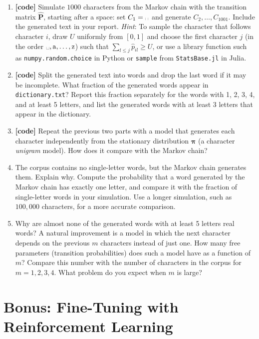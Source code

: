\documentclass[letterpaper]{article}
\newcommand{\spc}{\text{\textvisiblespace}}
\begin{document}
\begin{enumerate}
\item \textbf{[code]} Simulate $1000$ characters from the Markov chain with the transition matrix $\hat{\bm{P}}$, starting after a space: set $C_1 = \spc$ and generate $C_2, \dots, C_{1001}$. Include the generated text in your report. \emph{Hint}: To sample the character that follows character $i$, draw $U$ uniformly from $[0,1]$ and choose the first character $j$ (in the order $\spc, \mathrm{a}, \dots, \mathrm{z}$) such that $\sum_{l \le j} \hat{p}_{il} \ge U$, or use a library function such as \texttt{numpy.random.choice} in Python or \texttt{sample} from \texttt{StatsBase.jl} in Julia.
\item \textbf{[code]} Split the generated text into words and drop the last word if it may be incomplete. What fraction of the generated words appear in \texttt{dictionary.txt}? Report this fraction separately for the words with 1, 2, 3, 4, and at least 5 letters, and list the generated words with at least 3 letters that appear in the dictionary.
\item \textbf{[code]} Repeat the previous two parts with a model that generates each character independently from the stationary distribution $\bm{\pi}$ (a character \emph{unigram} model). How does it compare with the Markov chain?
\item The corpus contains no single-letter words, but the Markov chain generates them. Explain why. Compute the probability that a word generated by the Markov chain has exactly one letter, and compare it with the fraction of single-letter words in your simulation. Use a longer simulation, such as $100{,}000$ characters, for a more accurate comparison.
\item Why are almost none of the generated words with at least 5 letters real words? A natural improvement is a model in which the next character depends on the previous $m$ characters instead of just one. How many free parameters (transition probabilities) does such a model have as a function of $m$? Compare this number with the number of characters in the corpus for $m = 1, 2, 3, 4$. What problem do you expect when $m$ is large?
\end{enumerate}

\section{Bonus: Fine-Tuning with Reinforcement Learning}
\end{document}
